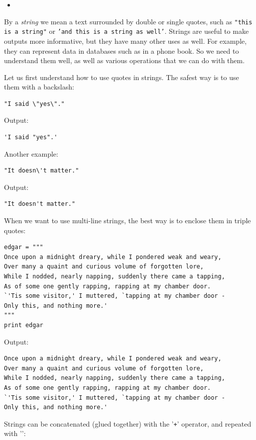 \begin{itemize}
\item
\end{itemize}

By a {\em string} we mean a text surrounded by double or single quotes, such as 
{\tt "this is a string"} or {\tt 'and this is a string as well'}.
Strings are useful to make outputs more informative, but 
they have many other uses as well. For example, they can represent data 
in databases such as in a phone book. So we need to understand them well,
as well as various operations that we can do with them.

Let us first understand how to use quotes in strings. The safest way is to use 
them with a backslash:

\begin{verbatim}
"I said \"yes\"."
\end{verbatim}
Output:

\begin{verbatim}
'I said "yes".'
\end{verbatim}
Another example:

\begin{verbatim}
"It doesn\'t matter."
\end{verbatim}
Output:

\begin{verbatim}
"It doesn't matter."
\end{verbatim}
When we want to use multi-line strings, the best way is to enclose them 
in triple quotes:

\begin{verbatim}
edgar = """
Once upon a midnight dreary, while I pondered weak and weary,
Over many a quaint and curious volume of forgotten lore,
While I nodded, nearly napping, suddenly there came a tapping,
As of some one gently rapping, rapping at my chamber door.
`'Tis some visitor,' I muttered, `tapping at my chamber door -
Only this, and nothing more.'
"""
print edgar
\end{verbatim}
Output:

\begin{verbatim}
Once upon a midnight dreary, while I pondered weak and weary,
Over many a quaint and curious volume of forgotten lore,
While I nodded, nearly napping, suddenly there came a tapping,
As of some one gently rapping, rapping at my chamber door.
`'Tis some visitor,' I muttered, `tapping at my chamber door -
Only this, and nothing more.'
\end{verbatim}
Strings can be concatenated (glued together) with the '{\tt +}' operator, and repeated with '{\tt *}':

